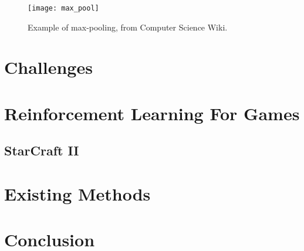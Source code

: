 \begin{figure}
    \centering
    \texttt{[image: max\_pool]}
    \caption{Example of max-pooling, from Computer Science Wiki\cite{max_pool}.}%
    \label{fig:max_pool}
\end{figure}

\section{Challenges}

\section{Reinforcement Learning For Games}\label{challenges:games}


\subsection{StarCraft II}

\section{Existing Methods}

\section{Conclusion}
